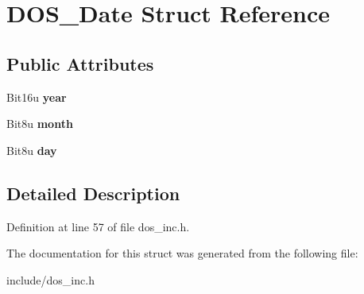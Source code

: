 \hypertarget{structDOS__Date}{\section{D\-O\-S\-\_\-\-Date Struct Reference}
\label{structDOS__Date}
}
\subsection*{Public Attributes}
\begin{DoxyCompactItemize}
\item 
\hypertarget{structDOS__Date_a480c5665aa7951b51918a0be3cf8d5a8}{Bit16u {\bfseries year}}\label{structDOS__Date_a480c5665aa7951b51918a0be3cf8d5a8}

\item 
\hypertarget{structDOS__Date_a996ff750d7000851801720e21873dbab}{Bit8u {\bfseries month}}\label{structDOS__Date_a996ff750d7000851801720e21873dbab}

\item 
\hypertarget{structDOS__Date_aec3df4c1f0d04287429364257f4ee82f}{Bit8u {\bfseries day}}\label{structDOS__Date_aec3df4c1f0d04287429364257f4ee82f}

\end{DoxyCompactItemize}


\subsection{Detailed Description}


Definition at line 57 of file dos\-\_\-inc.\-h.



The documentation for this struct was generated from the following file\-:\begin{DoxyCompactItemize}
\item 
include/dos\-\_\-inc.\-h\end{DoxyCompactItemize}
